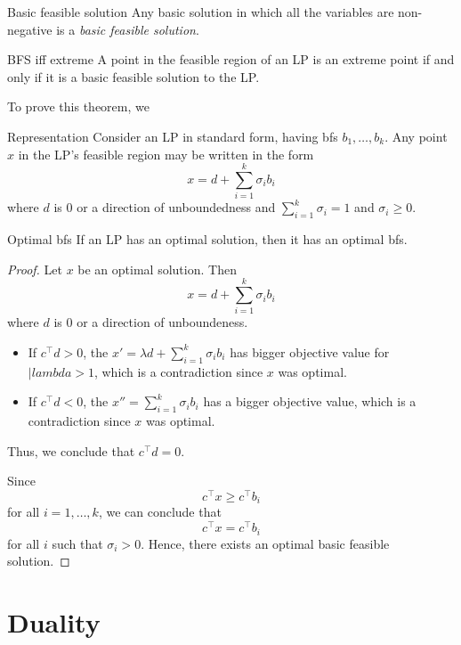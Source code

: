 \documentclass[letter,12pt]{book}
\renewcommand{\0}{\mathbf{0}}
\begin{document}
\begin{definition}{Basic feasible solution}{}
Any basic solution in which all the variables are non-negative is a \emph{basic feasible solution}.
\end{definition}

\begin{theorem}{BFS iff extreme}{}
A point in the feasible region of an LP is an extreme point if and only if it is a basic feasible solution to the LP.
\end{theorem}

To prove this theorem, we 

\begin{theorem}{Representation}{}
Consider an LP in standard form, having bfs $b_1, \dots, b_k$.  Any point $x$ in the LP's feasible region may be written in the form 
$$
x = d + \sum_{i=1}^k \sigma_i b_i
$$
where $d$ is $0$ or a direction of unboundedness and $\sum_{i=1}^k \sigma_i = 1$ and $\sigma_i \geq 0$.
\end{theorem}

\begin{theorem}{Optimal bfs}{}
If an LP has an optimal solution, then it has an optimal bfs.
\end{theorem}

\begin{proof}
Let $x$ be an optimal solution.  Then 
$$
x = d + \sum_{i=1}^k \sigma_i b_i
$$
where $d$ is 0 or a direction of unboundeness.  

\begin{itemize}
\item If $c^\top d > 0$, the $x'  = \lambda d + \sum_{i=1}^k \sigma_i b_i$ has bigger objective value for $|lambda > 1$, which is a contradiction since $x$ was optimal. 
\item If $c^\top d < 0$, the $x'' =\sum_{i=1}^k \sigma_i b_i$ has a bigger objective value, which is a contradiction since $x$ was optimal.
\end{itemize}
Thus, we conclude that $c^\top d = 0$.

Since $$c^\top x \geq c^\top b_i$$ for all $i=1, \dots, k$, we can conclude that 
$$
c^\top x = c^\top b_i
$$
for all $i$ such that $\sigma_i > 0$.   Hence, there exists an optimal basic feasible solution.
\end{proof}

\chapter{Duality}

\end{document}
